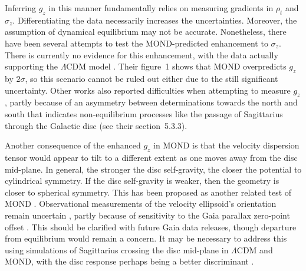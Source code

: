 \documentclass[fleqn,usenatbib,useAMS,onecolumn]{mnras} %
\begin{document}
Inferring $g_z$ in this manner fundamentally relies on measuring gradients in $\rho_t$ and $\sigma_z$. Differentiating the data necessarily increases the uncertainties. Moreover, the assumption of dynamical equilibrium may not be accurate. Nonetheless, there have been several attempts to test the MOND-predicted enhancement to $\sigma_z$. There is currently no evidence for this enhancement, with the data actually supporting the $\Lambda$CDM model \citep{Lisanti_2019}. Their figure~1 shows that MOND overpredicts $g_z$ by $2\sigma$, so this scenario cannot be ruled out either due to the still significant uncertainty. Other works also reported difficulties when attempting to measure $g_z$ \citep{Hagen_2018}, partly because of an asymmetry between determinations towards the north and south \citep{Guo_2020} that indicates non-equilibrium processes like the passage of Sagittarius through the Galactic disc (see their section~5.3.3).

Another consequence of the enhanced $g_z$ in MOND is that the velocity dispersion tensor would appear to tilt to a different extent as one moves away from the disc mid-plane. In general, the stronger the disc self-gravity, the closer the potential to cylindrical symmetry. If the disc self-gravity is weaker, then the geometry is closer to spherical symmetry. This has been proposed as another related test of MOND \citep{Bienayme_2009}. Observational measurements of the velocity ellipsoid's orientation remain uncertain \citep{Everall_2019}, partly because of sensitivity to the Gaia parallax zero-point offset \citep{Hagen_2019}. This should be clarified with future Gaia data releases, though departure from equilibrium would remain a concern. It may be necessary to address this using simulations of Sagittarius crossing the disc mid-plane in $\Lambda$CDM and MOND, with the disc response perhaps being a better discriminant \citep{Laporte_2018, Laporte_2019, Bennett_2022}.
\end{document}
